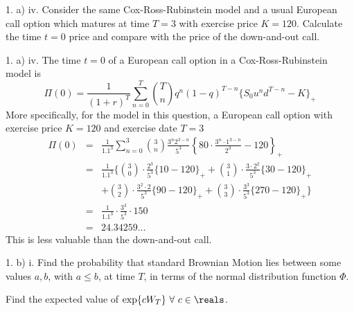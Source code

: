 \documentclass[11pt,a4paper]{article}
\begin{document}
\begin{question}{1. a) iv.}
  Consider the same Cox-Ross-Rubinstein model and a usual European call option which matures at time $T=3$ with exercise price $K=120$. Calculate the time $t=0$ price and compare with the price of the down-and-out call.
\end{question}

\begin{answer}{1. a) iv.}
  The time $t=0$ of a European call option in a Cox-Ross-Rubinstein model is
  \[ \Pi(0)=\frac1{(1+r)^T}\sum_{n=0}^T{T\choose n}q^n(1-q)^{T-n}\{S_0u^nd^{T-n}-K\}_+ \]
  More specifically, for the model in this question, a European call option with exercise price $K=120$ and exercise date $T=3$
  \[\begin{array}{rcl}
    \Pi(0)&=&\frac1{1.1^3}\sum_{n=0}^3{3\choose n}\frac{3^n2^{3-n}}{5^3}\left\{80\cdot\frac{3^n\cdot1^{3-n}}{2^3}-120\right\}_+\\
    &=&\frac1{1.1^3}\bigg\{{3\choose 0}\cdot\frac{2^3}{5^3}\{10-120\}_++{3\choose 1}\cdot\frac{3\cdot2^2}{5^3}\{30-120\}_+\\
    &&+{3\choose 2}\cdot\frac{3^2\cdot2}{5^3}\{90-120\}_++{3\choose 3}\cdot\frac{3^3}{5^3}\{270-120\}_+\bigg\}\\
    &=&\frac1{1.1^3}\cdot\frac{3^3}{5^3}\cdot150\\
    &=&24.34259\dots
  \end{array}\]
  This is less valuable than the down-and-out call.
\end{answer}

\begin{question}{1. b) i.}
  Find the probability that standard Brownian Motion lies between some values $a,b$, with $a\leq b$, at time $T$, in terms of the normal distribution function $\Phi$.
  \par Find the expected value of $\exp\{cW_T\}\ \forall\ c\in\reals$.
\end{question}
\end{document}
